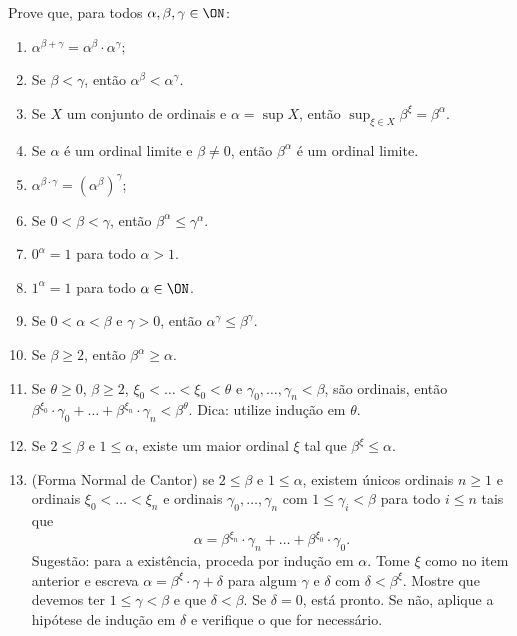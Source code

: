 \begin{exercise}
    Prove que, para todos $\alpha, \beta, \gamma \in \ON$:
    \begin{enumerate}[label=(\alph*)]
        \item $\alpha^{\beta+\gamma}=\alpha^\beta\cdot \alpha^\gamma$;
        \item Se $\beta<\gamma$, então $\alpha^\beta<\alpha^\gamma$.
        \item Se $X$ um conjunto de ordinais e $\alpha=\sup X$, então $\sup_{\xi \in X}\beta^\xi=\beta^\alpha$.
        \item Se $\alpha$ é um ordinal limite e $\beta\neq 0$, então $\beta^\alpha$ é um ordinal limite.
        \item $\alpha^{\beta\cdot \gamma}=(\alpha^\beta)^\gamma$;
        \item Se $0<\beta<\gamma$, então $\beta^\alpha\leq \gamma^\alpha$.
        \item $0^\alpha=1$ para todo $\alpha>1$.
        \item $1^\alpha=1$ para todo $\alpha\in \ON$.
        \item Se $0<\alpha<\beta$ e $\gamma>0$, então $\alpha^\gamma\leq\beta^\gamma$.
        \item Se $\beta\geq 2$, então $\beta^\alpha\geq \alpha$.
        \item Se $\theta\geq 0$, $\beta\geq 2$, $\xi_0< \dots < \xi_0<\theta$ e $\gamma_0, \dots, \gamma_n<\beta$, são ordinais, então $\beta^{\xi_0}\cdot \gamma_0+\dots+\beta^{\xi_n}\cdot \gamma_n<\beta^\theta$.
        Dica: utilize indução em $\theta$.
        \item Se $2\leq \beta$ e $1\leq \alpha$, existe um maior ordinal $\xi$ tal que $\beta^\xi\leq \alpha$.
        \item (Forma Normal de Cantor) se $2\leq \beta$ e $1\leq \alpha$, existem únicos ordinais $n\geq 1$ e ordinais $\xi_0<\dots<\xi_n$ e ordinais $\gamma_0,\dots,\gamma_n$ com $1\leq \gamma_i<\beta$ para todo $i\leq n$ tais que
        \[
            \alpha=\beta^{\xi_n}\cdot \gamma_n+\dots+\beta^{\xi_0}\cdot \gamma_0.
        \]
        Sugestão: para a existência, proceda por indução em $\alpha$.
        Tome $\xi$ como no item anterior e escreva $\alpha=\beta^\xi\cdot \gamma+\delta$ para algum $\gamma$ e $\delta$ com $\delta<\beta^\xi$.
        Mostre que devemos ter $1\leq \gamma<\beta$ e que $\delta<\beta$.
        Se $\delta=0$, está pronto.
        Se não, aplique a hipótese de indução em $\delta$ e verifique o que for necessário.


\end{enumerate}
\end{exercise}
